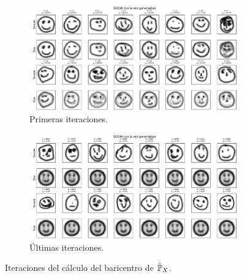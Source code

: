 \begin{figure}[htbp]
    \centering
    \begin{subfigure}[b]{0.95\textwidth}
        \includegraphics[width=\textwidth]{img/sgdw-iters/first-iters-GAN.pdf}
        \caption{Primeras iteraciones.}
        \label{fig:first-iters-GAN}
    \end{subfigure}
    \newline
    \begin{subfigure}[b]{0.95\textwidth}
        \includegraphics[width=\textwidth]{img/sgdw-iters/last-iters-GAN.pdf}
        \caption{Últimas iteraciones.}
        \label{fig:last-iters-GAN}
    \end{subfigure}
    \caption{Iteraciones del cálculo del baricentro de $\tilde\Prob_X$.}
    \label{fig:iters-GAN}
\end{figure}

